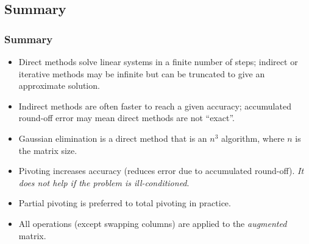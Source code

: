 \documentclass{beamer}
\begin{document}
\subsection{Summary}

 \begin{frame}
   \frametitle{Summary}

   \begin{itemize}
   \item Direct methods solve linear systems in a finite number of
     steps; indirect or iterative methods may be infinite but can be
     truncated to give an approximate solution.
   \item Indirect methods are often faster to reach a given accuracy;
     accumulated round-off error may mean direct methods are not
     ``exact''.
   \item Gaussian elimination is a direct method that is an $n^3$
     algorithm, where $n$ is the matrix size.
   \item Pivoting increases accuracy (reduces error due to accumulated
     round-off). \emph{It does not help if the problem is
       ill-conditioned}.
   \item Partial pivoting is preferred to total pivoting in practice.
   \item All operations (except swapping columns) are applied to the
     \emph{augmented} matrix.
   \end{itemize}
   
 \end{frame}
\end{document}
